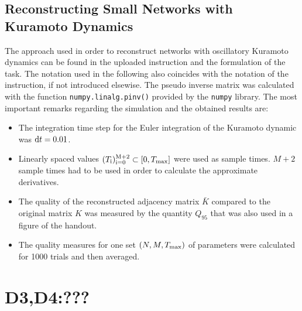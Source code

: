 \documentclass{scrartcl}
\begin{document}
\subsection{Reconstructing Small Networks with Kuramoto Dynamics}
The approach used in order to reconstruct networks with oscillatory
Kuramoto dynamics can be found in the uploaded instruction and the
formulation of the task. The notation used in the following also coincides
with the notation of the instruction, if not introduced elsewise. The
pseudo inverse matrix was calculated with the function
\texttt{numpy.linalg.pinv()} provided by the \texttt{numpy} library.
The most important remarks regarding the simulation and the obtained
results are:
\begin{itemize}
    \item The integration time step for the Euler integration of the
        Kuramoto dynamic was $\mathrm{d} t = 0.01$.
    \item Linearly spaced values $(T_{\mathrm{i}})_{\mathrm{i=0}}^{\mathrm{M+2}} \subset [0,
        T_{\mathrm{max}}]$ were used as sample times. $M+2$ sample times had to be
        used in order to calculate the approximate derivatives. 
    \item The quality of the reconstructed adjacency matrix $\bar{K}$
        compared to the original matrix $K$ was measured by the quantity $Q_{95}$
        that was also used in a figure of the handout.
    \item The quality measures for one set $(N, M, T_{\mathrm{max}})$ of
        parameters were calculated for 1000 trials and then averaged.
\end{itemize}




\section{D3,D4:???}
\end{document}
